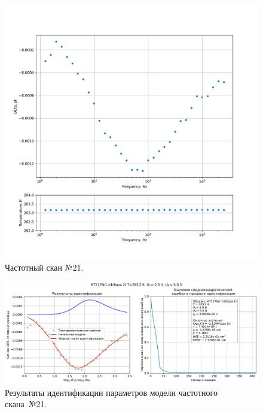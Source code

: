 \begin{figure}[!ht]
    \centering
    \includegraphics[width=1\textwidth]{../plots/КТ117№1_п1(база 2)_2500Гц-1Гц_1пФ_-10С_-2В-3В_20мВ_20мкс_шаг_0,1.pdf}
    \caption{Частотный скан №21.}
    \label{pic:frequency_scan_21}
\end{figure}

\begin{figure}[!ht]
    \centering
    \includegraphics[width=1\textwidth]{../plots/КТ117№1_п1(база 2)_2500Гц-1Гц_1пФ_-10С_-2В-3В_20мВ_20мкс_шаг_0,1_model.pdf}
    \caption{Результаты идентификации параметров модели частотного скана~№21.}
    \label{pic:frequency_scan_model21}
\end{figure}

\pagebreak


